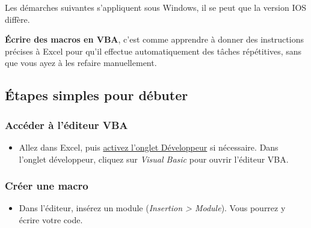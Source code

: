 \documentclass[
  letterpaper,
  DIV=11,
  numbers=noendperiod]{scrartcl}
\providecommand{\tightlist}{%
  \setlength{\itemsep}{0pt}\setlength{\parskip}{0pt}}\usepackage{longtable,booktabs,array}
\begin{document}
\begin{tcolorbox}[enhanced jigsaw, colback=white, opacitybacktitle=0.6, coltitle=black, title=\textcolor{quarto-callout-note-color}{\faInfo}\hspace{0.5em}{Note}, bottomrule=.15mm, leftrule=.75mm, arc=.35mm, breakable, toprule=.15mm, colbacktitle=quarto-callout-note-color!10!white, colframe=quarto-callout-note-color-frame, rightrule=.15mm, titlerule=0mm, bottomtitle=1mm, toptitle=1mm, left=2mm, opacityback=0]

Les démarches suivantes s'appliquent sous Windows, il se peut que la
version IOS diffère.

\end{tcolorbox}

\textbf{Écrire des macros en VBA}, c'est comme apprendre à donner des
instructions précises à Excel pour qu'il effectue automatiquement des
tâches répétitives, sans que vous ayez à les refaire manuellement.

\subsection{Étapes simples pour
débuter}\label{uxe9tapes-simples-pour-duxe9buter}

\subsubsection{Accéder à l'éditeur
VBA}\label{accuxe9der-uxe0-luxe9diteur-vba}

\begin{itemize}
\tightlist
\item
  Allez dans Excel, puis
  \href{https://support.microsoft.com/fr-fr/office/afficher-l-onglet-d\%C3\%A9veloppeur-e1192344-5e56-4d45-931b-e5fd9bea2d45}{activez
  l'onglet Développeur} si nécessaire. Dans l'onglet développeur,
  cliquez sur \emph{Visual Basic} pour ouvrir l'éditeur VBA.
\end{itemize}

\subsubsection{Créer une macro}\label{cruxe9er-une-macro}

\begin{itemize}
\tightlist
\item
  Dans l'éditeur, insérez un module (\emph{Insertion \textgreater{}
  Module}). Vous pourrez y écrire votre code.
\end{itemize}
\end{document}
